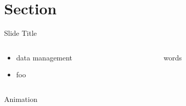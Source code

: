 \section{Section}

\begin{frame}{Slide Title}
\begin{columns}
\begin{column}{0.6\textwidth}
\begin{itemize}
\item data management
\item foo
\end{itemize}
\end{column}
\begin{column}{0.4\textwidth}
\begin{center}
words
\end{center}
\end{column}
\end{columns}
\end{frame}

\begin{frame}{Animation}



\end{frame}

